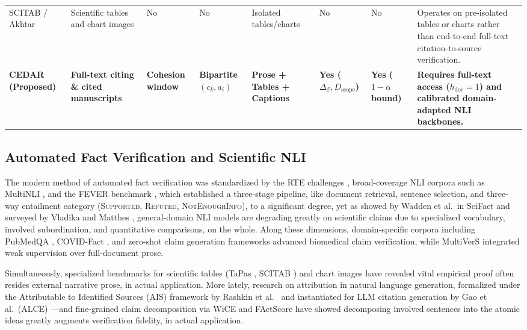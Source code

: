 \documentclass[journal]{IEEEtran}
\begin{document}
\begin{table}[t]
\begin{tabularx}{\textwidth}{L{2.6cm} L{2.2cm} C{1.4cm} C{1.5cm} C{1.5cm} C{1.5cm} C{1.4cm} Y}
SCITAB \cite{lu2023scitab} / Akhtar \cite{akhtar2023reading} & Scientific tables and chart images & No & No & Isolated tables/charts & No & No & Operates on pre-isolated tables or charts rather than end-to-end full-text citation-to-source verification. \\
\textbf{CEDAR (Proposed)} & \textbf{Full-text citing \& cited manuscripts} & \textbf{Cohesion window} & \textbf{Bipartite $(c_k, a_i)$} & \textbf{Prose + Tables + Captions} & \textbf{Yes ($\Delta_{\mathcal{E}}, D_{\text{scope}}$)} & \textbf{Yes ($1-\alpha$ bound)} & \textbf{Requires full-text access ($h_{\text{doc}}=1$) and calibrated domain-adapted NLI backbones.} \\
\bottomrule
\end{tabularx}
\end{table}

\subsection{Automated Fact Verification and Scientific NLI}
The modern method of automated fact verification was standardized by the RTE challenges \cite{dagan2006pascal}, broad-coverage NLI corpora such as MultiNLI \cite{williams2018broad}, and the FEVER benchmark \cite{thorne2018fever,zeng2021automated}, which established a three-stage pipeline, like document retrieval, sentence selection, and three-way entailment category (\textsc{Supported}, \textsc{Refuted}, \textsc{NotEnoughInfo}), to a significant degree, yet as showed by Wadden et al.\ in SciFact \cite{wadden2020fact} and surveyed by Vladika and Matthes \cite{vladika2023scientific}, general-domain NLI models are degrading greatly on scientific claims due to specialized vocabulary, involved subordination, and quantitative comparisons, on the whole. Along these dimensions, domain-specific corpora including PubMedQA \cite{jin2019pubmedqa}, COVID-Fact \cite{saakyan2021covidfact}, and zero-shot claim generation frameworks \cite{wright2022generating} advanced biomedical claim verification, while MultiVerS \cite{wadden2022multivers} integrated weak supervision over full-document prose.

Simultaneously, specialized benchmarks for scientific tables (TaPas \cite{herzig2020tapas}, SCITAB \cite{lu2023scitab}) and chart images \cite{akhtar2023reading} have revealed vital empirical proof often resides external narrative prose, in actual application. More lately, research on attribution in natural language generation, formalized under the Attributable to Identified Sources (AIS) framework by Rashkin et al.\ \cite{rashkin2023measuring} and instantiated for LLM citation generation by Gao et al.\ (ALCE) \cite{gao2023enabling}---and fine-grained claim decomposition via WiCE \cite{kamoi2023wice} and FActScore \cite{min2023factscore} have showed decomposing involved sentences into the atomic ideas greatly augments verification fidelity, in actual application.
\end{document}
